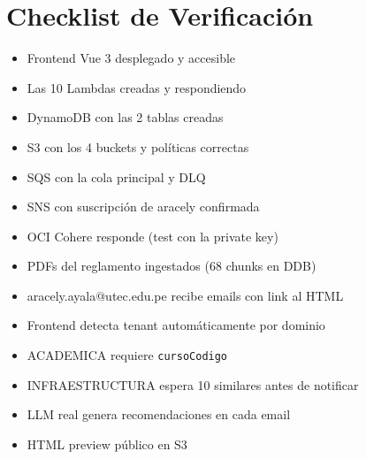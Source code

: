 \documentclass[11pt,a4paper]{article}
\begin{document}
\section{Checklist de Verificaci\'on}

\begin{itemize}[leftmargin=*]
  \item[$\checkmark$] Frontend Vue 3 desplegado y accesible
  \item[$\checkmark$] Las 10 Lambdas creadas y respondiendo
  \item[$\checkmark$] DynamoDB con las 2 tablas creadas
  \item[$\checkmark$] S3 con los 4 buckets y pol\'iticas correctas
  \item[$\checkmark$] SQS con la cola principal y DLQ
  \item[$\checkmark$] SNS con suscripci\'on de aracely confirmada
  \item[$\checkmark$] OCI Cohere responde (test con la private key)
  \item[$\checkmark$] PDFs del reglamento ingestados (68 chunks en DDB)
  \item[$\checkmark$] aracely.ayala@utec.edu.pe recibe emails con link al HTML
  \item[$\checkmark$] Frontend detecta tenant autom\'aticamente por dominio
  \item[$\checkmark$] ACADEMICA requiere \texttt{cursoCodigo}
  \item[$\checkmark$] INFRAESTRUCTURA espera 10 similares antes de notificar
  \item[$\checkmark$] LLM real genera recomendaciones en cada email
  \item[$\checkmark$] HTML preview p\'ublico en S3
\end{itemize}
\end{document}
